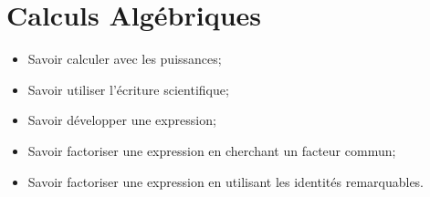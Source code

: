 \chapter{Calculs Algébriques}\label{ChCalculsAlgebriques}


\begin{acquis}
\begin{itemize}
\item Savoir calculer avec les puissances;
\item Savoir utiliser l'écriture scientifique;
\item Savoir développer une expression;
\item Savoir factoriser une expression en cherchant un facteur commun;
\item Savoir factoriser une expression en utilisant les identités remarquables.
\end{itemize}
\end{acquis}

\exercicesbase
\begin{colonne*exercice}

\end{colonne*exercice}

\connaissances
%

\pagebreak




